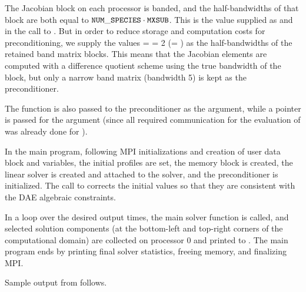 The Jacobian block on each processor is banded, and the half-bandwidths of
that block are both equal to ${\tt NUM\_SPECIES}\cdot{\tt MXSUB}$.
This is the value supplied as  and  in the call to
.  But in order to reduce storage and computation costs for
preconditioning, we supply the values  =  = 2
(= ) as the half-bandwidths of the retained band matrix blocks.
This means that the Jacobian elements are computed with a difference quotient
scheme using the true bandwidth of the block, but only a narrow band
matrix (bandwidth 5) is kept as the preconditioner.

The function  is also passed to the {\idabbdpre} preconditioner
as the  argument, while a  pointer is passed for the 
argument (since all required communication for the evaluation of  was
already done for ).

In the  main program, following MPI initializations and
creation of user data block  and  variables,
the initial profiles are set, the {\ida} memory block is created, the
{\sunlinsolspgmr} linear solver is created and attached to the {\ida}
solver, and the {\idabbdpre} preconditioner is initialized.
The call to  corrects the initial values so that they are
consistent with the DAE algebraic constraints.  

In a loop over the desired output times, the main solver function 
is called, and selected solution components (at the bottom-left and top-right
corners of the computational domain) are collected on processor 0 and printed
to . The main program ends by printing final solver statistics,
freeing memory, and finalizing MPI.

Sample output from  follows.

